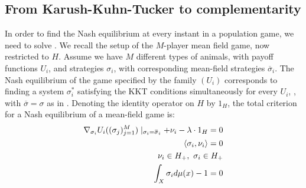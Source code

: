 \subsection{From Karush-Kuhn-Tucker to complementarity}
In order to find the Nash equilibrium at every instant in a population game, we need to solve . We recall the setup of the $M$-player mean field game, now restricted to $H$. Assume we have $M$ different types of animals, with payoff functions $U_i$, and strategies $\sigma_i$, with corresponding mean-field strategies $\overbar{\sigma}_i$.
The Nash equilibrium of the game specified by the family $(U_i)$ corresponds to finding a system $\sigma_i^*$ satisfying the KKT conditions simultaneously for every $U_i$, \citep{deimling2010nonlinear}, with $\overbar{\sigma}=\sigma$ as in . Denoting the identity operator on $H$ by $1_H$, the total criterion for a Nash equilibrium of a mean-field game  is:
\begin{equation}
  \label{eq:KKT_total}
  \begin{split}
  \nabla_{\sigma_i}U_i((\sigma_j)_{j=1}^M) \mid_{\sigma_i = \overbar{\sigma}_i}  + \nu_i - \lambda  \cdot 1_H = 0 \\
  \ip{\sigma_i}{\nu_i} = 0 \\
  \nu_i \in H_+,~\sigma_i \in H_+ \\
  \int_X \sigma_i d\mu(x)- 1 = 0
\end{split}
\end{equation}
